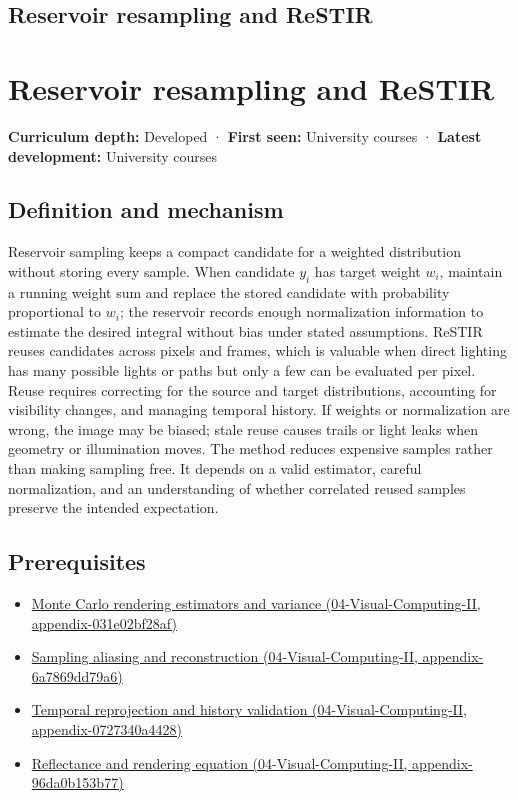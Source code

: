 \hypertarget{appendix-68be451b78b1}{}
\section*{Reservoir resampling and ReSTIR}
\chapter{Reservoir resampling and ReSTIR}\label{appendix-68be451b78b1-reservoir-resampling-and-restir}

\textbf{Curriculum depth:} Developed · \textbf{First seen:} University courses · \textbf{Latest development:} University courses

\section{Definition and mechanism}\label{appendix-68be451b78b1-definition-and-mechanism}

Reservoir sampling keeps a compact candidate for a weighted distribution without storing every sample. When candidate \(y_i\) has target weight \(w_i\), maintain a running weight sum and replace the stored candidate with probability proportional to \(w_i\); the reservoir records enough normalization information to estimate the desired integral without bias under stated assumptions. ReSTIR reuses candidates across pixels and frames, which is valuable when direct lighting has many possible lights or paths but only a few can be evaluated per pixel. Reuse requires correcting for the source and target distributions, accounting for visibility changes, and managing temporal history. If weights or normalization are wrong, the image may be biased; stale reuse causes trails or light leaks when geometry or illumination moves. The method reduces expensive samples rather than making sampling free. It depends on a valid estimator, careful normalization, and an understanding of whether correlated reused samples preserve the intended expectation.

\section{Prerequisites}\label{appendix-68be451b78b1-prerequisites}

\begin{itemize}
\tightlist
\item
  \href{../04-Visual-Computing-II/main.pdf\#nameddest=appendix-031e02bf28af}{Monte Carlo rendering estimators and variance (04-Visual-Computing-II, appendix-031e02bf28af)}
\item
  \href{../04-Visual-Computing-II/main.pdf\#nameddest=appendix-6a7869dd79a6}{Sampling aliasing and reconstruction (04-Visual-Computing-II, appendix-6a7869dd79a6)}
\item
  \href{../04-Visual-Computing-II/main.pdf\#nameddest=appendix-0727340a4428}{Temporal reprojection and history validation (04-Visual-Computing-II, appendix-0727340a4428)}
\item
  \href{../04-Visual-Computing-II/main.pdf\#nameddest=appendix-96da0b153b77}{Reflectance and rendering equation (04-Visual-Computing-II, appendix-96da0b153b77)}
\end{itemize}

